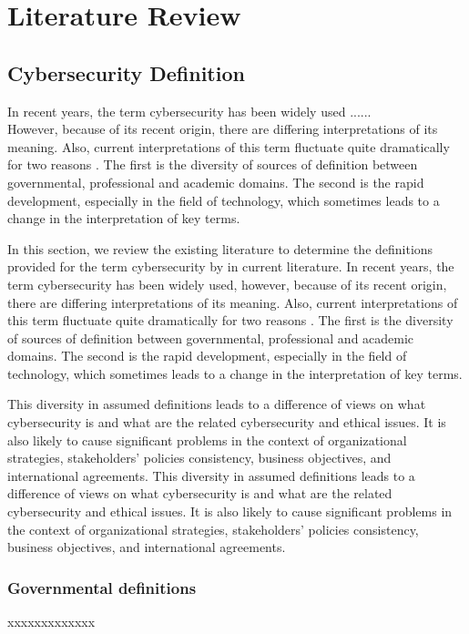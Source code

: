 \chapter{Literature Review}
\section{Cybersecurity Definition}
In recent years, the term cybersecurity has been widely used \cite{craigen2014defining,schatz2017towards,giles2013divided}......\\ 


However, because of its recent origin, there are differing interpretations of its meaning. Also, current interpretations of this term fluctuate quite dramatically for two reasons \cite{schatz2017towards}. The first is the diversity of sources of definition between governmental, professional and academic domains. The second  is the rapid development, especially in the field of technology, which sometimes leads to a change in the interpretation of key terms. 

In this section, we review  the existing literature to determine the definitions provided for the term cybersecurity by in current literature.
\if
In recent years, the term cybersecurity has been widely used\cite{craigen2014defining,schatz2017towards,gile 2013divided}, however, 
because of
	 its recent origin, there are differing interpretations of its meaning. 
	Also, current interpretations of this term fluctuate quite dramatically for two reasons \cite{schatz2017towards}. 
		The first is the diversity of sources of definition between governmental, professional and academic domains. 
		The second  is the rapid development, especially in the field of technology, which sometimes leads to a change in the 				 		interpretation of key terms.

 This diversity in assumed definitions leads to 
		a difference of views on what cybersecurity is and what are the related cybersecurity and ethical issues. 
		It is also likely to cause significant problems in the context of organizational strategies, stakeholders' policies consistency, business 			objectives, and international agreements.
\fi
 This diversity in assumed definitions leads to 
a difference of views on what cybersecurity is and what are the related cybersecurity and ethical issues. 
It is also likely to cause significant problems in the context of organizational strategies, stakeholders' policies consistency, business objectives, and international agreements.
\subsection{Governmental definitions}
 xxxxxxxxxxxxx
